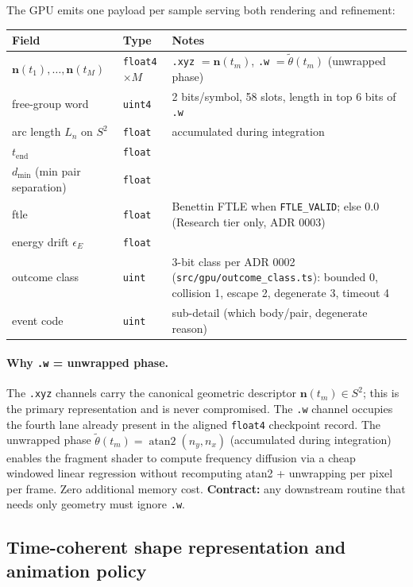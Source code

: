 \documentclass[11pt]{report}
\DeclareMathOperator{\atanTwo}{atan2}
\begin{document}
The GPU emits one payload per sample serving both rendering and refinement:
\begin{center}
\begin{tabular}{lll}
\toprule
Field & Type & Notes \\
\midrule
$\mathbf n(t_1),\ldots,\mathbf n(t_M)$ & \texttt{float4}$\times M$ & \texttt{.xyz} $= \mathbf n(t_m)$, \texttt{.w} $= \tilde\theta(t_m)$ (unwrapped phase) \\
free-group word & \texttt{uint4} & 2 bits/symbol, 58 slots, length in top 6 bits of \texttt{.w} \\
arc length $L_n$ on $S^2$ & \texttt{float} & accumulated during integration \\
$t_{\mathrm{end}}$ & \texttt{float} & \\
$d_{\min}$ (min pair separation) & \texttt{float} & \\
ftle & \texttt{float} & Benettin FTLE when \texttt{FTLE\_VALID}; else $0.0$ (Research tier only, ADR 0003) \\
energy drift $\epsilon_E$ & \texttt{float} & \\
outcome class & \texttt{uint} & 3-bit class per ADR 0002 (\texttt{src/gpu/outcome\_class.ts}): bounded 0, collision 1, escape 2, degenerate 3, timeout 4 \\
event code & \texttt{uint} & sub-detail (which body/pair, degenerate reason) \\
\bottomrule
\end{tabular}
\end{center}

\paragraph{Why \texttt{.w} = unwrapped phase.} The \texttt{.xyz} channels carry the canonical geometric descriptor $\mathbf n(t_m)\in S^2$; this is the primary representation and is never compromised. The \texttt{.w} channel occupies the fourth lane already present in the aligned \texttt{float4} checkpoint record. The unwrapped phase $\tilde\theta(t_m)=\atanTwo(n_y,n_x)$ (accumulated during integration) enables the fragment shader to compute frequency diffusion via a cheap windowed linear regression without recomputing atan2 + unwrapping per pixel per frame. Zero additional memory cost. \textbf{Contract:} any downstream routine that needs only geometry must ignore \texttt{.w}.

\subsection{Time-coherent shape representation and animation policy}
\label{sec:animation_policy}
\end{document}
